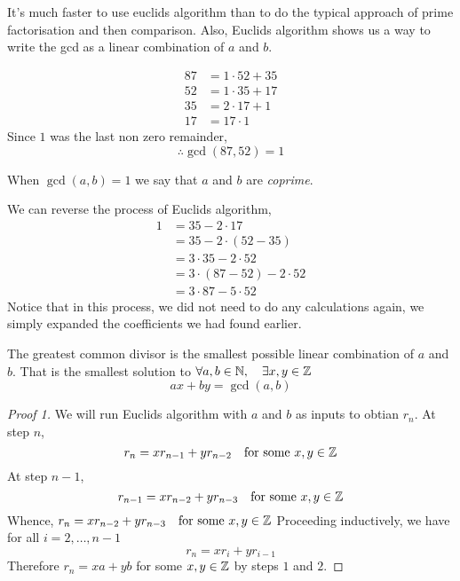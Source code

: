 \documentclass{article}
\begin{document}
\begin{remark}
    It's much faster to use euclids algorithm than to do the typical approach of prime factorisation and then comparison. Also, Euclids algorithm shows us a way to write the gcd as a linear combination of $a$ and $b$.
\end{remark}

\begin{eg}[$\gcd(87, 52)$]
    \begin{align*}
        87 &= 1 \cdot 52 + 35 \\
        52 &= 1 \cdot 35 + 17 \\
        35 &= 2 \cdot 17 + 1 \\
        17 &= 17 \cdot 1
    \end{align*}
    Since $1$ was the last non zero remainder, 
    \[
        \therefore \gcd(87, 52) = 1
    \]
\end{eg}

\begin{defi}[Coprime]
    When $\gcd(a, b) = 1$ we say that $a$ and $b$ are \emph{coprime}.
\end{defi}

\begin{remark}
    We can reverse the process of Euclids algorithm, 
    \begin{align*}
        1 &= 35 - 2 \cdot 17 \\
        &= 35 - 2 \cdot (52 - 35) \\
        &= 3 \cdot 35 - 2 \cdot 52 \\
        &= 3 \cdot (87 - 52) - 2 \cdot 52 \\
        &= 3 \cdot 87 - 5 \cdot 52
    \end{align*}
    Notice that in this process, we did not need to do any calculations again, we simply expanded the coefficients we had found earlier.
\end{remark}

\begin{nthm}\label{th:2-7}
    The greatest common divisor is the smallest possible linear combination of $a$ and $b$. 
    That is the smallest solution to $\forall a, b \in \mathbb{N}, \quad \exists x, y \in \mathbb{Z}$
    \[
        ax + by = \gcd(a, b)  
    \]
\end{nthm}

\begin{proof}[Proof 1]
    We will run Euclids algorithm with $a$ and $b$ as inputs to obtian $r_n$. At step $n$,
    \[
        r_n = x r_{n-1} + y r_{n-2} \quad \text{for some} \ x, y \in \mathbb{Z}   
    \]
    At step $n-1$,
    \[
        r_{n-1} = x r_{n-2} + y r_{n-3} \quad \text{for some} \ x, y \in \mathbb{Z}   
    \]
    Whence, $r_n = x r_{n-2} + y r_{n-3} \quad \text{for some} \ x, y \in \Z$
    Proceeding inductively, we have for all $i = 2, \ldots, n-1$
    \[
        r_n = xr_i + yr_{i-1}    
    \]
    Therefore $r_n = xa + yb$ for some $x, y \in \mathbb{Z}$ by steps $1$ and $2$.
\end{proof}
\end{document}
